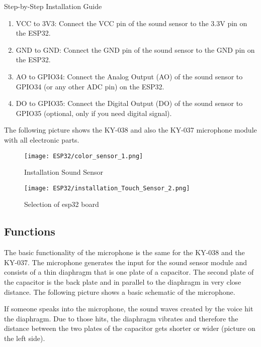 Step-by-Step Installation Guide
\begin{enumerate}
	\item VCC to 3V3: Connect the VCC pin of the sound sensor to the 3.3V pin on the ESP32.
	\item GND to GND: Connect the GND pin of the sound sensor to the GND pin on the ESP32.
	\item AO to GPIO34: Connect the Analog Output (AO) of the sound sensor to GPIO34 (or any other ADC pin) on the ESP32.
	\item DO to GPIO35: Connect the Digital Output (DO) of the sound sensor to GPIO35 (optional, only if you need digital signal).
\end{enumerate}


The following picture shows the KY-038 and also the KY-037 microphone module with all electronic parts.

\begin{figure}  
	\begin{center}
 		\texttt{[image: ESP32/color\_sensor\_1.png]}
		\caption{Installation Sound Sensor} 
		\label{fig:Python 3.10.}
	\end{center}
\end{figure}	



\begin{figure}  
	\begin{center}
		\texttt{[image: ESP32/installation\_Touch\_Sensor\_2.png]}
		\caption{Selection of esp32 board} 
		\label{fig:Python 3.10.}
	\end{center}
\end{figure}	

\subsection{Functions}
The basic functionality of the microphone is the same for the KY-038 and the KY-037. The microphone generates the input for the sound sensor module and consists of a thin diaphragm that is one plate of a capacitor. The second plate of the capacitor is the back plate and in parallel to the diaphragm in very close distance. The following picture shows a basic schematic of the microphone.

If someone speaks into the microphone, the sound waves created by the voice hit the diaphragm. Due to those hits, the diaphragm vibrates and therefore the distance between the two plates of the capacitor gets shorter or wider (picture on the left side).

